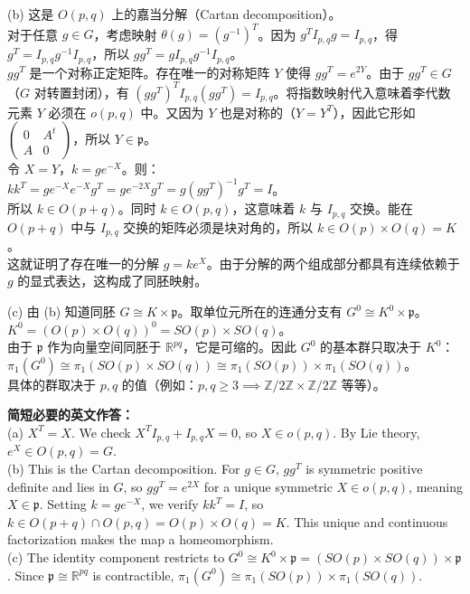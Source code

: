 \documentclass{ctexart}
\begin{document}
(b) 这是 $O(p, q)$ 上的嘉当分解（Cartan decomposition）。\\
对于任意 $g \in G$，考虑映射 $\theta(g) = (g^{-1})^T$。因为 $g^T I_{p,q} g = I_{p,q}$，得 $g^T = I_{p,q} g^{-1} I_{p,q}$，所以 $gg^T = g I_{p,q} g^{-1} I_{p,q}$。\\
$gg^T$ 是一个对称正定矩阵。存在唯一的对称矩阵 $Y$ 使得 $gg^T = e^{2Y}$。由于 $gg^T \in G$（$G$ 对转置封闭），有 $(gg^T)^T I_{p,q} (gg^T) = I_{p,q}$。将指数映射代入意味着李代数元素 $Y$ 必须在 $o(p, q)$ 中。又因为 $Y$ 也是对称的（$Y=Y^T$），因此它形如 $\begin{pmatrix} 0 & A^t \\ A & 0 \end{pmatrix}$，所以 $Y \in \mathfrak{p}$。\\
令 $X = Y$，$k = g e^{-X}$。则：\\
$k k^T = g e^{-X} e^{-X} g^T = g e^{-2X} g^T = g (gg^T)^{-1} g^T = I$。\\
所以 $k \in O(p+q)$。同时 $k \in O(p, q)$，这意味着 $k$ 与 $I_{p,q}$ 交换。能在 $O(p+q)$ 中与 $I_{p,q}$ 交换的矩阵必须是块对角的，所以 $k \in O(p) \times O(q) = K$。\\
这就证明了存在唯一的分解 $g = ke^X$。由于分解的两个组成部分都具有连续依赖于 $g$ 的显式表达，这构成了同胚映射。

(c) 由 (b) 知道同胚 $G \cong K \times \mathfrak{p}$。取单位元所在的连通分支有 $G^0 \cong K^0 \times \mathfrak{p}$。\\
$K^0 = (O(p) \times O(q))^0 = SO(p) \times SO(q)$。\\
由于 $\mathfrak{p}$ 作为向量空间同胚于 $\mathbb{R}^{pq}$，它是可缩的。因此 $G^0$ 的基本群只取决于 $K^0$：\\
$\pi_1(G^0) \cong \pi_1(SO(p) \times SO(q)) \cong \pi_1(SO(p)) \times \pi_1(SO(q))$。\\
具体的群取决于 $p, q$ 的值（例如：$p, q \ge 3 \implies \mathbb{Z}/2\mathbb{Z} \times \mathbb{Z}/2\mathbb{Z}$ 等等）。

\vspace{1em}
\textbf{简短必要的英文作答：}\\
(a) $X^T = X$. We check $X^T I_{p,q} + I_{p,q} X = 0$, so $X \in o(p, q)$. By Lie theory, $e^X \in O(p, q) = G$.\\
(b) This is the Cartan decomposition. For $g \in G$, $gg^T$ is symmetric positive definite and lies in $G$, so $gg^T = e^{2X}$ for a unique symmetric $X \in o(p, q)$, meaning $X \in \mathfrak{p}$. Setting $k = ge^{-X}$, we verify $kk^T = I$, so $k \in O(p+q) \cap O(p,q) = O(p) \times O(q) = K$. This unique and continuous factorization makes the map a homeomorphism.\\
(c) The identity component restricts to $G^0 \cong K^0 \times \mathfrak{p} = (SO(p) \times SO(q)) \times \mathfrak{p}$. Since $\mathfrak{p} \cong \mathbb{R}^{pq}$ is contractible, $\pi_1(G^0) \cong \pi_1(SO(p)) \times \pi_1(SO(q))$.
\end{document}
